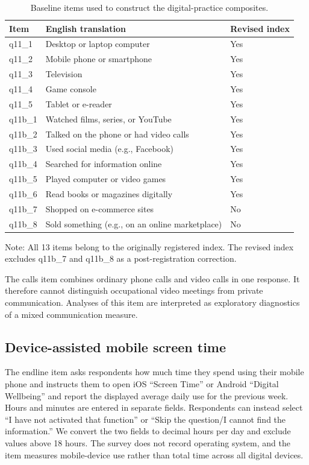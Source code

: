 \documentclass[11pt,a4paper]{article}
\begin{document}
\begin{table}[htbp]
	\centering
	\caption{Baseline items used to construct the digital-practice composites.}
	\label{tab:digital-items}
	\begin{tabular}{@{}p{}p{}p{}@{}}
		\toprule
		Item & English translation & Revised index \\
		\midrule
		q11\_1 & Desktop or laptop computer & Yes \\
		q11\_2 & Mobile phone or smartphone & Yes \\
		q11\_3 & Television & Yes \\
		q11\_4 & Game console & Yes \\
		q11\_5 & Tablet or e-reader & Yes \\
		q11b\_1 & Watched films, series, or YouTube & Yes \\
		q11b\_2 & Talked on the phone or had video calls & Yes \\
		q11b\_3 & Used social media (e.g., Facebook) & Yes \\
		q11b\_4 & Searched for information online & Yes \\
		q11b\_5 & Played computer or video games & Yes \\
		q11b\_6 & Read books or magazines digitally & Yes \\
		q11b\_7 & Shopped on e-commerce sites & No \\
		q11b\_8 & Sold something (e.g., on an online marketplace) & No \\
		\bottomrule
	\end{tabular}
	\begin{flushleft}\footnotesize
	Note: All 13 items belong to the originally registered index. The revised
	index excludes q11b\_7 and q11b\_8 as a post-registration correction.
	\end{flushleft}
\end{table}

The calls item combines ordinary phone calls and video calls in one response.
It therefore cannot distinguish occupational video meetings from private
communication. Analyses of this item are interpreted as exploratory diagnostics
of a mixed communication measure.

\subsection{Device-assisted mobile screen time}
The endline item asks respondents how much time they spend using their mobile
phone and instructs them to open iOS ``Screen Time'' or Android ``Digital
Wellbeing'' and report the displayed average daily use for the previous week.
Hours and minutes are entered in separate fields. Respondents can instead select
``I have not activated that function'' or ``Skip the question/I cannot find the
information.'' We convert the two fields to decimal hours per day and exclude
values above 18 hours. The survey does not record operating system, and the item
measures mobile-device use rather than total time across all digital devices.
\end{document}
